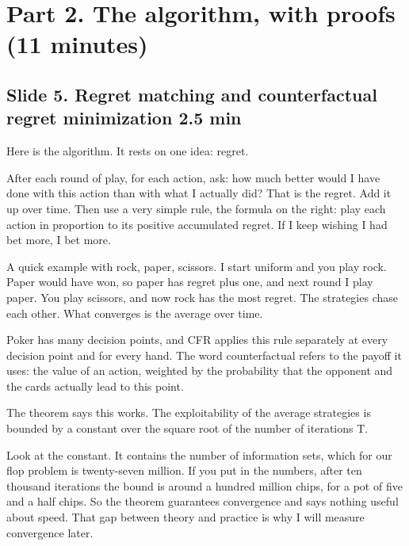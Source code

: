 \documentclass[11pt]{article}
\newcommand{\slidehead}[3]{\subsection*{Slide #1. #2 \hfill {\normalfont\small #3}}}
\begin{document}
\section{Part 2. The algorithm, with proofs (11 minutes)}

\slidehead{5}{Regret matching and counterfactual regret minimization}{2.5 min}
\begin{say}
Here is the algorithm. It rests on one idea: regret.

After each round of play, for each action, ask: how much better would I have done with this action than with what I
actually did? That is the regret. Add it up over time. Then use a very simple rule, the formula on the right: play
each action in proportion to its positive accumulated regret. If I keep wishing I had bet more, I bet more.

A quick example with rock, paper, scissors. I start uniform and you play rock. Paper would have won, so paper has
regret plus one, and next round I play paper. You play scissors, and now rock has the most regret. The strategies
chase each other. What converges is the average over time.

Poker has many decision points, and CFR applies this rule separately at every decision point and for every hand.
The word counterfactual refers to the payoff it uses: the value of an action, weighted by the probability that the
opponent and the cards actually lead to this point.

The theorem says this works. The exploitability of the average strategies is bounded by a constant over the square
root of the number of iterations T.

Look at the constant. It contains the number of information sets, which for our flop problem is twenty-seven
million. If you put in the numbers, after ten thousand iterations the bound is around a hundred million chips, for a
pot of five and a half chips. So the theorem guarantees convergence and says nothing useful about speed. That gap
between theory and practice is why I will measure convergence later.
\end{say}
\end{document}
